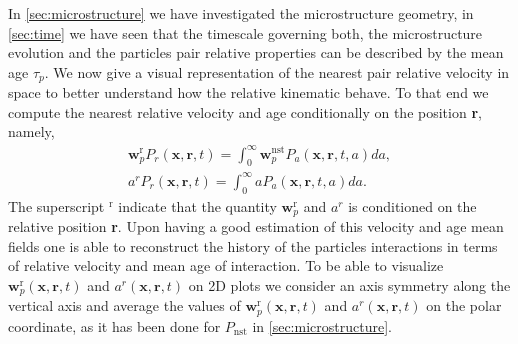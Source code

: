 
In \ref{sec:microstructure} we have investigated the microstructure geometry, 
in \ref{sec:time} we have seen that the timescale governing both, the microstructure evolution and the particles pair relative properties can be described by the mean age $\tau_p$.   
We now give a visual representation of the nearest pair relative velocity in space to better understand how the relative kinematic behave.  
To that end we compute the nearest relative velocity and age  conditionally on the position \textbf{r}, namely,
\begin{align*}
    \textbf{w}^\text{r}_pP_r(\textbf{x},\textbf{r},t)
    =\int_0^\infty \textbf{w}^\text{nst}_pP_a(\textbf{x},\textbf{r},t,a) da,\\
    a^rP_r(\textbf{x},\textbf{r},t)
    =\int_0^\infty a P_a(\textbf{x},\textbf{r},t,a) da.
\end{align*}
The superscript $^\text{r}$ indicate that the quantity $\textbf{w}^\text{r}_p$ and $a^r$ is conditioned on the relative position \textbf{r}.   
Upon having a good estimation of this velocity and age mean fields one is able to reconstruct the history of the particles interactions in terms of relative velocity and mean age of interaction. 
To be able to visualize
$\textbf{w}^\text{r}_p(\textbf{x},\textbf{r},t)$
and 
$a^r(\textbf{x},\textbf{r},t)$
on 2D plots we consider an axis symmetry along the vertical axis and average the values of 
$\textbf{w}^\text{r}_p(\textbf{x},\textbf{r},t)$
and $a^r(\textbf{x},\textbf{r},t)$
on the polar coordinate, as it has been done for $P_\text{nst}$ in \ref{sec:microstructure}. 

